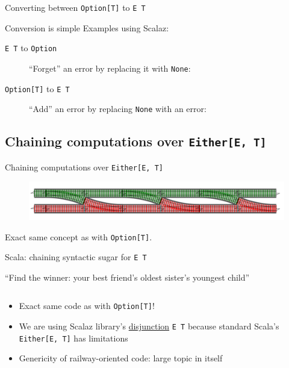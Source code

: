 \begin{frame}{Converting between \texttt{Option[T]} to
    \texttt{E \/ T}}
  \begin{block}{Conversion is simple}
    Examples using Scalaz:


    \begin{description}
    \item[\texttt{E \/ T} to \texttt{Option}]
      ``Forget'' an error by replacing it with \texttt{None}:
    \item[\texttt{Option[T]} to \texttt{E \/ T}]
      ``Add'' an error by replacing \texttt{None} with an error:
    \end{description}
  \end{block}
\end{frame}

\subsection{Chaining computations over \texttt{Either[E, T]}}

\begin{frame}{Chaining computations over \texttt{Either[E, T]}}
  \begin{figure}
    \includegraphics[width=\textwidth]{Recipe_RailwaySwitch3.png}
  \end{figure}

  Exact same concept as with \texttt{Option[T]}.
\end{frame}

\begin{frame}{Scala: chaining syntactic sugar for \texttt{E \/ T}}
  \begin{example}{``Find the winner: your best friend's oldest sister's
      youngest child''}
    \inputminted{scala}{ResultWinner.scala}
  \end{example}

  \begin{itemize}
  \item Exact same code as with \texttt{Option[T]}!
  \item We are using Scalaz library's \href{https://github.com/scalaz/scalaz/blob/series/7.1.x/core/src/main/scala/scalaz/Either.scala}{disjunction} {\texttt{E \/ T}}
    because standard Scala's \texttt{Either[E, T]} has limitations
  \item Genericity of railway-oriented code: large topic in itself
  \end{itemize}
\end{frame}

